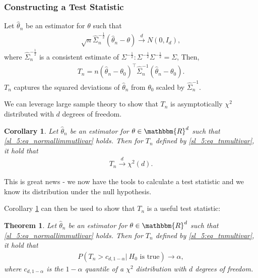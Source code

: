 \documentclass{article}
\newtheorem{theorem}{Theorem}
\newtheorem{corollary}{Corollary}[theorem]
\begin{document}
    \subsubsection*{Constructing a Test Statistic}
    Let $\hat{\theta}_n$ be an estimator for $\theta$ such that \begin{align}\label{sl_5:eq_normallimmutlivar}
        \sqrt{n}\hat{\Sigma}_n^{-\frac{1}{2}}\left(\hat{\theta}_n - \theta\right) \overset{d}{\to} N(0, I_d),
    \end{align}
    where $\hat{\Sigma}_n^{-\frac{1}{2}}$ is a consistent estimate of $\Sigma^{-\frac{1}{2}}: \Sigma^{-\frac{1}{2}} \Sigma^{-\frac{1}{2}} = \Sigma$, Then,
    \begin{align}\label{sl_5:eq_tnmultivar}
        T_n = n\left(\hat{\theta}_n - \theta_0\right)^\top\hat{\Sigma}_n^{-1}\left(\hat{\theta}_n - \theta_0\right).
    \end{align}
    $T_n$ captures the squared deviations of $\hat{\theta}_n$ from $\theta_0$ scaled by $\hat{\Sigma}_n^{-1}.$

    We can leverage large sample theory to show that $T_n$ is asymptotically $\chi^2$ distributed with $d$ degrees of freedom.
    
    \begin{corollary}\label{sl_5:cor_chi2}
     Let  $\hat{\theta}_n$ be an estimator for $\theta \in \mathbbm{R}^d$ such that \eqref{sl_5:eq_normallimmutlivar} holds. Then for $T_n$ defined by  \eqref{sl_5:eq_tnmultivar}, it hold that \begin{align}
            T_n \overset{d}{\to} \chi^2(d).
        \end{align}
    \end{corollary}


    This is great news - we now have the tools to calculate a test statistic and 
    we know its distribution under the null hypothesis.

    

    Corollary \ref{sl_5:cor_chi2} can then be used to show that $T_n$ is a useful test statistic:
    
    \begin{theorem}
     Let  $\hat{\theta}_n$ be an estimator for $\theta \in \mathbbm{R}^d$ such that \eqref{sl_5:eq_normallimmutlivar} holds. Then for $T_n$ defined by  \eqref{sl_5:eq_tnmultivar}, it hold that \begin{align}
            P(T_n > c_{d, 1-\alpha}\vert \: H_0 \text{ is true}) \to \alpha,
        \end{align}
        where $c_{d, 1-\alpha}$ is the $1-\alpha$ quantile of a $\chi^2$ distribution with $d$ degrees of freedom.
    \end{theorem}
\end{document}
